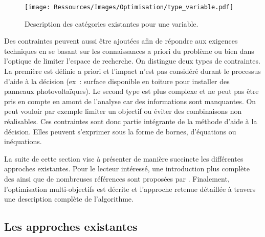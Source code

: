 \begin{figure}
    \centering
    \texttt{[image: Ressources/Images/Optimisation/type\_variable.pdf]}
    \caption[Description des catégories existantes pour une variable]
            {Description des catégories existantes pour une variable.}
    \label{fig:type_variable}
\end{figure}

Des contraintes peuvent aussi être ajoutées afin de répondre aux exigences
techniques en se basant sur les connaissances a priori du problème ou bien dans
l’optique de limiter l’espace de recherche. On distingue deux types de contraintes.
La première est définie a priori et l’impact n’est pas considéré durant le processus
d’aide à la décision (ex~: surface disponible en toiture pour installer des
panneaux photovoltaïques).
Le second type est plus complexe et ne peut pas être pris en compte en amont de
l’analyse car des informations sont manquantes. On peut vouloir par exemple limiter
un objectif ou éviter des combinaisons non réalisables. Ces contraintes sont donc
partie intégrante de la méthode d’aide à la décision.
Elles peuvent s’exprimer sous la forme de bornes, d’équations ou inéquations.

La suite de cette section vise à présenter de manière succincte les différentes
approches existantes. Pour le lecteur intéressé, une introduction plus complète
des  ainsi que de nombreuses références sont proposées par \textcite{BenMena2000}.
Finalement, l’optimisation multi-objectifs est décrite et l’approche retenue
détaillée à travers une description complète de l’algorithme.

\subsection{Les approches existantes} %
\label{sub:les_approches_existantes}
